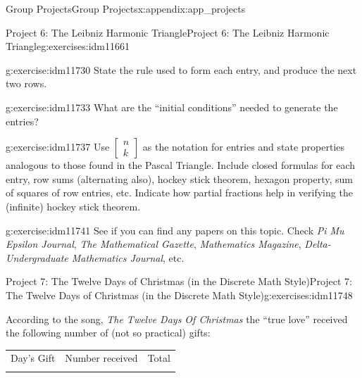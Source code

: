 \documentclass[oneside,10pt,]{book}
\numberwithin{equation}{chapter}
\newcommand{\hrulemedium}{\noalign{\hrule height 0.07em}}
\begin{document}
\begin{appendixptx}{Group Projects}{}{Group Projects}{}{}{x:appendix:app_projects}
\begin{exercises-section-numberless}{Project 6: The Leibniz Harmonic Triangle}{}{Project 6: The Leibniz Harmonic Triangle}{}{}{g:exercises:idm11661}
\begin{sidebyside}{1}{0}{0}{0}
\begin{sbspanel}{1}
{\par}
\end{sbspanel}%
\end{sidebyside}%
\begin{divisionexercise}{1}{}{}{g:exercise:idm11730}%
State the rule used to form each entry, and produce the next two rows.%
\end{divisionexercise}%
\begin{divisionexercise}{2}{}{}{g:exercise:idm11733}%
What are the ``initial conditions'' needed to generate the entries?%
\end{divisionexercise}%
\begin{divisionexercise}{3}{}{}{g:exercise:idm11737}%
Use \(\begin{bmatrix} n\\ k \end{bmatrix}\) as the notation for entries and state properties analogous to those found in the Pascal Triangle. Include closed formulas for each entry, row sums (alternating also), hockey stick theorem, hexagon property, sum of squares of row entries, etc. Indicate how partial fractions help in verifying the (infinite) hockey stick theorem.%
\end{divisionexercise}%
\begin{divisionexercise}{4}{}{}{g:exercise:idm11741}%
See if you can find any papers on this topic. Check \emph{Pi Mu Epsilon Journal}, \emph{The Mathematical Gazette}, \emph{Mathematics Magazine}, \emph{Delta-Undergraduate Mathematics Journal}, etc.%
\end{divisionexercise}%
\end{exercises-section-numberless}
%
%
\typeout{************************************************}
\typeout{************************************************}
%
\begin{exercises-section-numberless}{Project 7: The Twelve Days of Christmas (in the Discrete Math Style)}{}{Project 7: The Twelve Days of Christmas (in the Discrete Math Style)}{}{}{g:exercises:idm11748}
\begin{introduction}{}%
According to the song, \emph{The Twelve Days Of Christmas} the ``true love'' received the following number of (not so practical) gifts:%
\begin{sidebyside}{1}{0.2}{0.2}{0}%
\begin{sbspanel}{0.6}%
{\centering%
\begin{tabular}{lll}
Day's Gift&Number received&Total\tabularnewline\hrulemedium

\end{tabular}}
\end{sbspanel}
\end{sidebyside}
\end{introduction}
\end{exercises-section-numberless}
\end{appendixptx}
\end{document}
